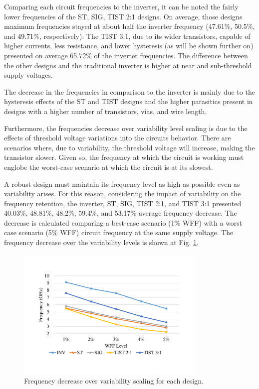 \documentclass[pgmicro,mestrado,english]{iiufrgs}
\begin{document}
Comparing each circuit frequencies to the inverter, it can be noted the fairly lower frequencies of the ST, SIG, TIST 2:1 designs. On average, those designs maximum frequencies stayed at about half the inverter frequency (47.61\%, 50.5\%, and 49.71\%, respectively). The TIST 3:1, due to its wider transistors, capable of higher currents,  less resistance, and lower hysteresis (as will be shown further on) presented on average 65.72\% of the inverter frequencies. The difference between the other designs and the traditional inverter is higher at near and sub-threshold supply voltages. 

The decrease in the frequencies in comparison to the inverter is mainly due to the hysteresis effects of the ST and TIST designs and the higher parasitics present in designs with a higher number of transistors, vias, and wire length.

Furthermore, the frequencies decrease over variability level scaling is due to the effects of threshold voltage variations into the circuits behavior. There are scenarios where, due to variability, the threshold voltage will increase, making the transistor slower. Given so, the frequency at which the circuit is working must englobe the worst-case scenario at which the circuit is at its slowest.

A robust design must maintain its frequency level as high as possible even as variability arises. For this reason, considering the impact of variability on the frequency retention, the inverter, ST, SIG, TIST 2:1, and TIST 3:1 presented 40.03\%, 48.81\%, 48.2\%, 59.4\%, and 53.17\% average frequency decrease. The decrease is calculated comparing a best-case scenario (1\% WFF) with a worst case scenario (5\% WFF) circuit frequency at the same supply voltage. The frequency decrease over the variability levels is shown at Fig. \ref{fig:freqRetWFF}.

\begin{figure}[]
\centering
\includegraphics[width=0.8\textwidth, trim={2cm 3cm 2cm 3cm},clip]{freqRetWFF.pdf}
\caption{Frequency decrease over variability scaling for each design.}
\label{fig:freqRetWFF}
\end{figure}
\end{document}
